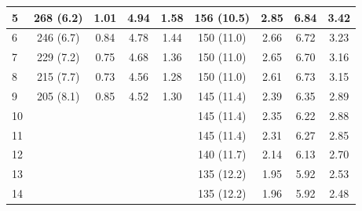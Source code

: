 \begin{table}[]
\begin{tabular}{|l|c|c|c|c|c|c|c|c|}
5                                     & 268 (6.2)         & 1.01                & 4.94              & 1.58                  & 156 (10.5)        & 2.85                & 6.84              & 3.42                  \\ \hline
6                                     & 246 (6.7)         & 0.84                & 4.78              & 1.44                  & 150 (11.0)        & 2.66                & 6.72              & 3.23                  \\ \hline
7                                     & 229 (7.2)         & 0.75                & 4.68              & 1.36                  & 150 (11.0)        & 2.65                & 6.70              & 3.16                  \\ \hline
8                                     & 215 (7.7)         & 0.73                & 4.56              & 1.28                  & 150 (11.0)        & 2.61                & 6.73              & 3.15                  \\ \hline
9                                     & 205 (8.1)         & 0.85                & 4.52              & 1.30                  & 145 (11.4)        & 2.39                & 6.35              & 2.89                  \\ \hline
10                                    &                   &                     &                   &                       & 145 (11.4)        & 2.35                & 6.22              & 2.88                  \\ \hline
11                                    &                   &                     &                   &                       & 145 (11.4)        & 2.31                & 6.27              & 2.85                  \\ \hline
12                                    &                   &                     &                   &                       & 140 (11.7)        & 2.14                & 6.13              & 2.70                  \\ \hline
13                                    &                   &                     &                   &                       & 135 (12.2)        & 1.95                & 5.92              & 2.53                  \\ \hline
14                                    &                   &                     &                   &                       & 135 (12.2)        & 1.96                & 5.92              & 2.48                  \\ \hline

\end{tabular}
\end{table}
